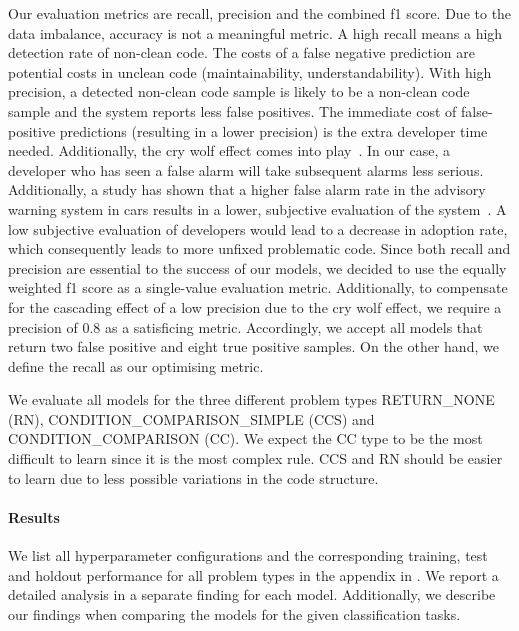 Our evaluation metrics are recall, precision and the combined f1 score. Due to the data imbalance, accuracy is not a meaningful metric. A high recall means a high detection rate of non-clean code. The costs of a false negative prediction are potential costs in unclean code (maintainability, understandability). With high precision, a detected non-clean code sample is likely to be a non-clean code sample and the system reports less false positives. The immediate cost of false-positive predictions (resulting in a lower precision) is the extra developer time needed.
Additionally, the cry wolf effect comes into play~\cite{breznitz_cry_1984}. In our case, a developer who has seen a false alarm will take subsequent alarms less serious. Additionally, a study has shown that a higher false alarm rate in the advisory warning system in cars results in a lower, subjective evaluation of the system~\cite{naujoks_cooperative_2016}. A low subjective evaluation of developers would lead to a decrease in adoption rate, which consequently leads to more unfixed problematic code. Since both recall and precision are essential to the success of our models, we decided to use the equally weighted f1 score as a single-value evaluation metric.
Additionally, to compensate for the cascading effect of a low precision due to the cry wolf effect, we require a precision of 0.8 as a satisficing metric. Accordingly, we accept all models that return two false positive and eight true positive samples. On the other hand, we define the recall as our optimising metric.

We evaluate all models for the three different problem types RETURN\_NONE (RN), CONDITION\_COMPARISON\_SIMPLE (CCS) and CONDITION\_COMPARISON (CC). We expect the CC type to be the most difficult to learn since it is the most complex rule. CCS and RN should be easier to learn due to less possible variations in the code structure.

\paragraph{Results}
We list all hyperparameter configurations and the corresponding training, test and holdout performance for all problem types in the appendix in . We report a detailed analysis in a separate finding for each model. Additionally, we describe our findings when comparing the models for the given classification tasks.



